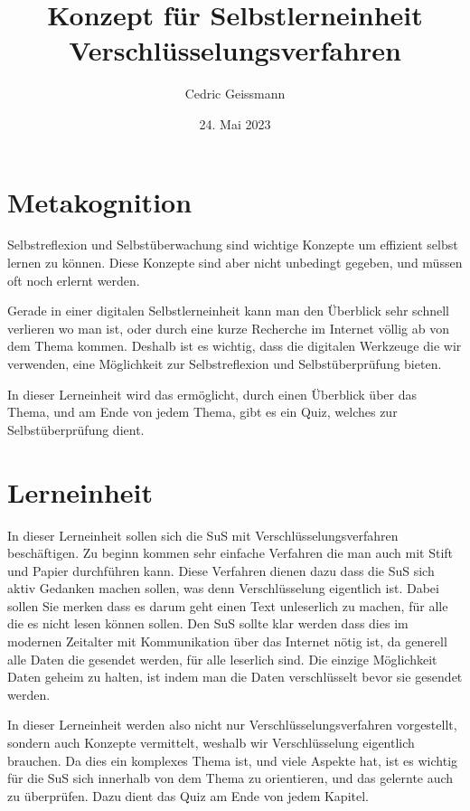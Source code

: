 \documentclass{article}
\author{Cedric Geissmann}
\title{%
Konzept für Selbstlerneinheit \\
\large Verschlüsselungsverfahren
}
\date{24. Mai 2023}
\begin{document}
\maketitle

\section*{Metakognition}

Selbstreflexion und Selbstüberwachung sind wichtige Konzepte um effizient selbst lernen zu können. Diese Konzepte sind aber nicht unbedingt gegeben, und müssen oft noch erlernt werden.

Gerade in einer digitalen Selbstlerneinheit kann man den Überblick sehr schnell verlieren wo man ist, oder durch eine kurze Recherche im Internet völlig ab von dem Thema kommen. Deshalb ist es wichtig, dass die digitalen Werkzeuge die wir verwenden, eine Möglichkeit zur Selbstreflexion und Selbstüberprüfung bieten.

In dieser Lerneinheit wird das ermöglicht, durch einen Überblick über das Thema, und am Ende von jedem Thema, gibt es ein Quiz, welches zur Selbstüberprüfung dient.

\section*{Lerneinheit}

In dieser Lerneinheit sollen sich die SuS mit Verschlüsselungsverfahren beschäftigen. Zu beginn kommen sehr einfache Verfahren die man auch mit Stift und Papier durchführen kann. Diese Verfahren dienen dazu dass die SuS sich aktiv Gedanken machen sollen, was denn Verschlüsselung eigentlich ist. Dabei sollen Sie merken dass es darum geht einen Text unleserlich zu machen, für alle die es nicht lesen können sollen. Den SuS sollte klar werden dass dies im modernen Zeitalter mit Kommunikation über das Internet nötig ist, da generell alle Daten die gesendet werden, für alle leserlich sind. Die einzige Möglichkeit Daten geheim zu halten, ist indem man die Daten verschlüsselt bevor sie gesendet werden.

In dieser Lerneinheit werden also nicht nur Verschlüsselungsverfahren vorgestellt, sondern auch Konzepte vermittelt, weshalb wir Verschlüsselung eigentlich brauchen. Da dies ein komplexes Thema ist, und viele Aspekte hat, ist es wichtig für die SuS sich innerhalb von dem Thema zu orientieren, und das gelernte auch zu überprüfen. Dazu dient das Quiz am Ende von jedem Kapitel.
\end{document}
